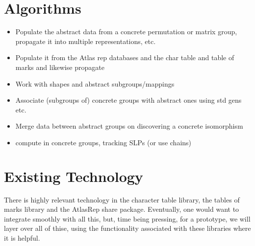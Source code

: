 \documentclass{article}
\begin{document}
\section{Algorithms}

\begin{itemize}
\item Populate the abstract data from a concrete permutation or matrix 
group, propagate it into multiple representations, etc.
\item Populate it from the Atlas rep databases and the char table and
table of marks and likewise propagate
\item Work with shapes and abstract subgroups/mappings
\item Associate (subgroups of) concrete groups with abstract ones
using std gens etc.
\item Merge data between abstract groups on discovering a concrete
isomorphism
\item compute in concrete groups, tracking SLPs (or use chains)
\end{itemize}

\section{Existing Technology}

There is highly relevant technology in the character table library,
the tables of marks library and the AtlasRep share
package. Eventually, one would want to integrate smoothly with all
this, but, time being pressing, for a prototype, we will layer over
all of thise, using the functionality associated with these libraries
where it is helpful.
\end{document}
